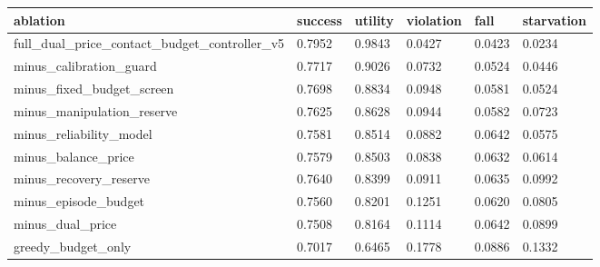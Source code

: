 \begin{tabular}{llllll}
\toprule
ablation & success & utility & violation & fall & starvation \\
\midrule
full\_dual\_price\_contact\_budget\_controller\_v5 & 0.7952 & 0.9843 & 0.0427 & 0.0423 & 0.0234 \\
minus\_calibration\_guard & 0.7717 & 0.9026 & 0.0732 & 0.0524 & 0.0446 \\
minus\_fixed\_budget\_screen & 0.7698 & 0.8834 & 0.0948 & 0.0581 & 0.0524 \\
minus\_manipulation\_reserve & 0.7625 & 0.8628 & 0.0944 & 0.0582 & 0.0723 \\
minus\_reliability\_model & 0.7581 & 0.8514 & 0.0882 & 0.0642 & 0.0575 \\
minus\_balance\_price & 0.7579 & 0.8503 & 0.0838 & 0.0632 & 0.0614 \\
minus\_recovery\_reserve & 0.7640 & 0.8399 & 0.0911 & 0.0635 & 0.0992 \\
minus\_episode\_budget & 0.7560 & 0.8201 & 0.1251 & 0.0620 & 0.0805 \\
minus\_dual\_price & 0.7508 & 0.8164 & 0.1114 & 0.0642 & 0.0899 \\
greedy\_budget\_only & 0.7017 & 0.6465 & 0.1778 & 0.0886 & 0.1332 \\
\bottomrule
\end{tabular}
